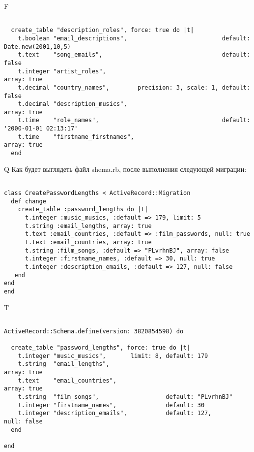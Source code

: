 F
\begin{verbatim}

  create_table "description_roles", force: true do |t|
    t.boolean "email_descriptions",                           default: Date.new(2001,10,5)
    t.text    "song_emails",                                  default: false
    t.integer "artist_roles",                                                                 array: true
    t.decimal "country_names",        precision: 3, scale: 1, default: false
    t.decimal "description_musics",                                                           array: true
    t.time    "role_names",                                   default: '2000-01-01 02:13:17'
    t.time    "firstname_firstnames",                                                         array: true
  end

\end{verbatim}

Q
Как будет выглядеть файл shema.rb, после выполнения следующей миграции:

\begin{verbatim}

class CreatePasswordLengths < ActiveRecord::Migration 
  def change 
    create_table :password_lengths do |t| 
      t.integer :music_musics, :default => 179, limit: 5
      t.string :email_lengths, array: true
      t.text :email_countries, :default => :film_passwords, null: true
      t.text :email_countries, array: true
      t.string :film_songs, :default => "PLvrhnBJ", array: false
      t.integer :firstname_names, :default => 30, null: true
      t.integer :description_emails, :default => 127, null: false
   end
end
end
\end{verbatim}

T
\begin{verbatim}

ActiveRecord::Schema.define(version: 3820854598) do

  create_table "password_lengths", force: true do |t|
    t.integer "music_musics",       limit: 8, default: 179
    t.string  "email_lengths",                                                  array: true
    t.text    "email_countries",                                                array: true
    t.string  "film_songs",                   default: "PLvrhnBJ"
    t.integer "firstname_names",              default: 30
    t.integer "description_emails",           default: 127,        null: false
  end

end
\end{verbatim}


